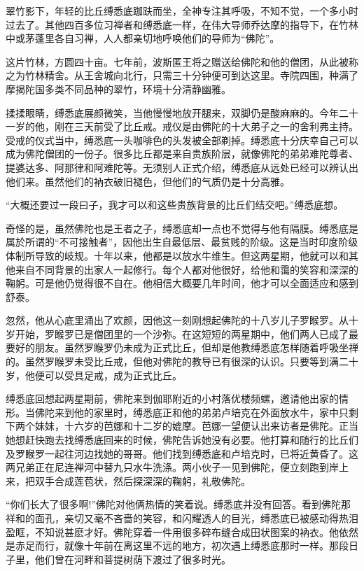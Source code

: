 \documentclass[12pt,twoside,openany]{book}
\begin{document}
翠竹影下，年轻的比丘缚悉底跏趺而坐，全神专注其呼吸，不知不觉，一个多小时过去了。其他四百多位习禅者和缚悉底一样，在伟大导师乔达摩的指导下，在竹林中或茅蓬里各自习禅，人人都亲切地呼唤他们的导师为“佛陀”。

这片竹林，方圆四十亩。七年前，波斯匿王将之赠送给佛陀和他的僧团，从此被称之为竹林精舍。从王舍城向北行，只需三十分钟便可到达这里。寺院四围，种满了摩揭陀国多类不同品种的翠竹，环境十分清静幽雅。

揉揉眼睛，缚悉底展颜微笑，当他慢慢地放开腿来，双脚仍是酸麻麻的。今年二十一岁的他，刚在三天前受了比丘戒。戒仪是由佛陀的十大弟子之一的舍利弗主持。受戒的仪式当中，缚悉底一头咖啡色的头发被全部剃掉。缚悉底十分庆幸自己可以成为佛陀僧团的一份子。很多比丘都是来自贵族阶层，就像佛陀的弟弟难陀尊者、提婆达多、阿那律和阿难陀等。无须别人正式介绍，缚悉底从远处已经可以辨认出他们来。虽然他们的衲衣破旧褪色，但他们的气质仍是十分高雅。

“大概还要过一段曰子，我才可以和这些贵族背景的比丘们结交吧。”缚悉底想。

奇怪的是，虽然佛陀也是王者之子，缚悉底却一点也不觉得与他有隔膜。缚悉底是属於所谓的“不可接触者”，因他出生自最低层、最贫贱的阶级。这是当时印度阶级体制所导致的岐规。十年以来，他都是以放水牛维生。但这两星期，他就可以和其他来自不同背景的出家人一起修行。每个人都对他很好，给他和霭的笑容和深深的鞠躬。可是他仍觉得很不自在。他相信大概要几年时间，他才可以全面适应和感到舒泰。

忽然，他从心底里涌出了欢颜，因他这一刻刚想起佛陀的十八岁儿子罗睺罗。从十岁开始，罗睺罗已是僧团里的一个沙弥。在这短短的两星期中，他们两人已成了最要好的朋友。虽然罗睺罗仍未成为正式比丘，但却是他教缚悉底怎样随着呼吸坐禅的。虽然罗睺罗未受比丘戒，但他对佛陀的教导已有很深的认识。只要等到满二十岁，他便可以受具足戒，成为正式比丘。

缚悉底回想起两星期前，佛陀来到伽耶附近的小村落优楼频螺，邀请他出家的情形。当佛陀来到他的家里时，缚悉底正和他的弟弟卢培克在外面放水牛，家中只剩下两个妹妹，十六岁的芭娜和十二岁的媲摩。芭娜一望便认出来访者是佛陀。正当她想赶快跑去找缚悉底回来的时候，佛陀告诉她没有必要。他打算和随行的比丘们及罗睺罗一起往河边找她的哥哥。他们找到缚悉底和卢培克时，已将近黄昏了。这两兄弟正在尼连禅河中替九只水牛洗涤。两小伙子一见到佛陀，便立刻跑到岸上来，把双手合成莲苞状，然后探深深的鞠躬，礼敬佛陀。

“你们长大了很多啊!”佛陀对他俩热情的笑着说。缚悉底并没有回答。看到佛陀那祥和的面孔，亲切又毫不吝啬的笑容，和闪耀透人的目光，缚悉底已被感动得热泪盈眶，不知说甚麽才好。佛陀穿着一件用很多碎布缝合成田状图案的衲衣。他依然是赤足而行，就像十年前在离这里不远的地方，初次遇上缚悉底那时一样。那段日子里，他们曾在河畔和菩提树荫下渡过了很多时光。
\end{document}

